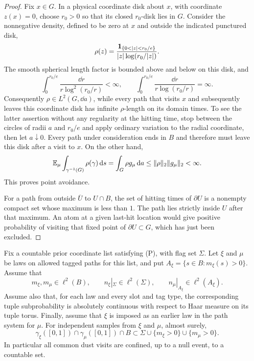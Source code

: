 \begin{proof}
Fix $x\in G$.  In a physical coordinate disk about $x$, with coordinate
$z(x)=0$, choose $r_0>0$ so that its closed $r_0$-disk lies in $G$.
Consider the nonnegative density, defined to be zero at $x$ and outside
the indicated punctured disk,
\[
 \rho(z)=\frac{\ind_{\{0<|z|<r_0/e\}}}
 {|z|\log(r_0/|z|)}.
\]
The smooth spherical length factor is bounded above and below on this
disk, and
\[
 \int_0^{r_0/e}\frac{\dd r}{r\log^2(r_0/r)}<\infty,
 \qquad
 \int_0^{r_0/e}\frac{\dd r}{r\log(r_0/r)}=\infty.
\]
Consequently $\rho\in L^2(G,\dd a)$, while every path that visits $x$ and
subsequently leaves this coordinate disk has infinite $\rho$-length on
its domain times.  To see the latter assertion without any regularity at
the hitting time, stop between the circles of radii $a$ and $r_0/e$ and
apply ordinary variation to the radial coordinate, then let $a\downarrow0$.
Every path under consideration ends in $B$ and therefore must leave this
disk after a visit to $x$.  On the other hand,
\[
 \operatorname{\mathbb E}_\mu\int_{\gamma^{-1}(G)}\rho(\gamma)\,\mathrm d s
 =\int_G\rho g_\mu\,\mathrm d a
 \le \|\rho\|_2\|g_\mu\|_2<\infty.
\]
This proves point avoidance.

For a path from outside $\overline U$ to $U\cap B$, the set of hitting
times of $\partial U$ is a nonempty compact set whose maximum is less
than $1$.  The path lies strictly inside $U$ after that maximum.  An atom
at a given last-hit location would give positive probability of visiting
that fixed point of $\partial U\subset G$, which has just been excluded.
\end{proof}

\begin{lemma}
\label{lem:diffuse-intersections}
Fix a countable prior coordinate list satisfying \textup{(P)}, with flag
set $\Sigma$.  Let $\xi$ and $\mu$ be laws on allowed tagged paths for
this list, and put $A_\xi=\{s\in B:m_\xi(s)>0\}$.  Assume that
\[
 m_\xi,m_\mu\in\ell^2(B),\qquad
 n_\xi|_\Sigma\in\ell^2(\Sigma),\qquad
 n_\mu|_{A_\xi}\in\ell^2(A_\xi).
\]
Assume also that, for each law and every slot and tag type, the corresponding
tuple subprobability is absolutely continuous with respect to Haar measure
on its tuple torus.  Finally, assume that $\xi$ is imposed as an earlier
law in the path system for $\mu$.
For independent samples from $\xi$ and $\mu$, almost surely,
\[
 \gamma_\xi([0,1])\cap\gamma_\mu([0,1])\cap B
 \subset
 \Sigma\cup\{m_\xi>0\}\cup\{m_\mu>0\}.
\]
In particular all common dust visits are confined, up to a null event,
to a countable set.
\end{lemma}

